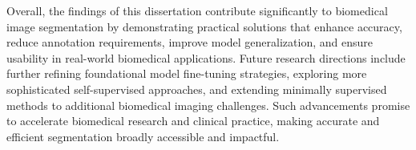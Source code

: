 \documentclass[./dissertation.tex]{subfiles}
\begin{document}
Overall, the findings of this dissertation contribute significantly to biomedical image segmentation by demonstrating practical solutions that enhance accuracy, reduce annotation requirements, improve model generalization, and ensure usability in real-world biomedical applications. Future research directions include further refining foundational model fine-tuning strategies, exploring more sophisticated self-supervised approaches, and extending minimally supervised methods to additional biomedical imaging challenges. Such advancements promise to accelerate biomedical research and clinical practice, making accurate and efficient segmentation broadly accessible and impactful.
\end{document}
